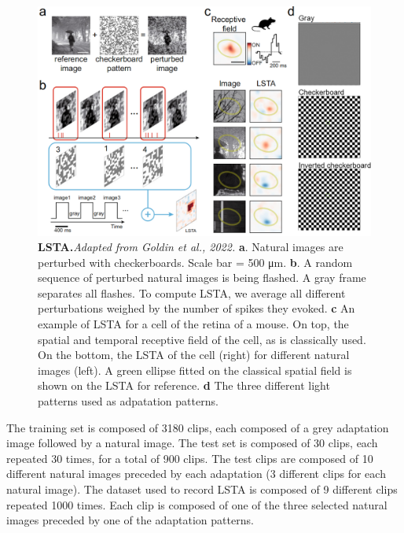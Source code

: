\begin{figure}
    \centering
    \includegraphics[width=\textwidth]{pics/LSTAExplainV3.png}
    \caption{\textbf{LSTA.}\textit{Adapted from Goldin et al., 2022.}
        \textbf{a}.
        Natural images are
        perturbed with checkerboards. Scale bar = 500 μm. \textbf{b}. A random
        sequence
        of
        perturbed natural
        images is being flashed. A gray frame separates all flashes. To compute
        LSTA, we average all different
        perturbations weighed by the number of spikes they evoked. \textbf{c}
        An example
        of
        LSTA for a cell of the
        retina of a mouse. On top, the spatial and temporal receptive field of
        the
        cell, as is classically used. On
        the bottom, the LSTA of the cell (right) for different natural images
        (left). A green ellipse fitted on
        the classical spatial field is shown on the LSTA for reference.
        \textbf{d} The three different light patterns used as adpatation patterns. }
    \label{fig:LSTA}
\end{figure}

The training set is composed of 3180 clips, each composed of a grey
adaptation image followed by a natural image. The test set is composed of 30
clips, each repeated 30 times, for a total of 900 clips.
The test clips are composed of 10 different natural
images preceded by each adaptation (3 different clips for each natural image).
The dataset used to record LSTA is composed of 9 different clips repeated 1000
times. Each clip is composed of one of the three selected natural images
preceded by one of the adaptation patterns.

